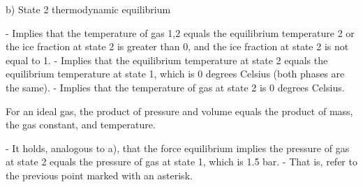 b) State 2 thermodynamic equilibrium

- Implies that the temperature of gas 1,2 equals the equilibrium temperature 2 or the ice fraction at state 2 is greater than 0, and the ice fraction at state 2 is not equal to 1.
- Implies that the equilibrium temperature at state 2 equals the equilibrium temperature at state 1, which is 0 degrees Celsius (both phases are the same).
- Implies that the temperature of gas at state 2 is 0 degrees Celsius.

For an ideal gas, the product of pressure and volume equals the product of mass, the gas constant, and temperature.

- It holds, analogous to a), that the force equilibrium implies the pressure of gas at state 2 equals the pressure of gas at state 1, which is 1.5 bar.
- That is, refer to the previous point marked with an asterisk.